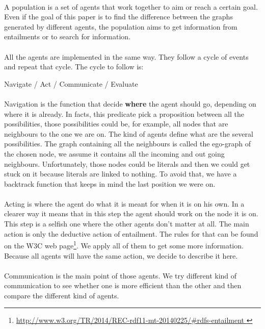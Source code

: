 \documentclass{article}
\begin{document}
		\paragraph{}
			A population is a set of agents that work together to aim or reach a certain goal.
			Even if the goal of this paper is to find the difference between the graphs generated by different agents,
			the population aims to get information from entailments or to search for information.
		\paragraph{}
			All the agents are implemented in the same way.
			They follow a cycle of events and repeat that cycle.
			The cycle to follow is:
		\begin{center}
			Navigate / Act / Communicate / Evaluate
		\end{center}
		\paragraph{}
			Navigation is the function that decide \textbf{where} the agent should go, depending on where it is already.
			In facts, this predicate pick a proposition between all the possibilities,
			those possibilities could be, for example, all nodes that are neighbours to the one we are on.
			The kind of agents define what are the several possibilities.
			The graph containing all the neighbours is called the ego-graph of the chosen node,
			we assume it contains all the incoming and out going neighbours.
			Unfortunately, those nodes could be literals and then we could get stuck on it because literals are linked to nothing.
			To avoid that, we have a backtrack function that keeps in mind the last position we were on.
		\paragraph{}
			Acting is where the agent do what it is meant for when it is on his own.
			In a clearer way it means that in this step the agent should work on the node it is on.
			This step is a selfish one where the other agents don't matter at all.
			The main action is only the deductive action of entailment.
			The rules for that can be found on the W3C web page\footnote{
				\url{http://www.w3.org/TR/2014/REC-rdf11-mt-20140225/\#rdfs-entailment
			}}.
			We apply all of them to get some more information.
			Because all agents will have the same action, we decide to describe it here.
		\paragraph{}
			Communication is the main point of those agents.
			We try different kind of communication to see whether one is more efficient than the other
			and then compare the different kind of agents.
\end{document}
